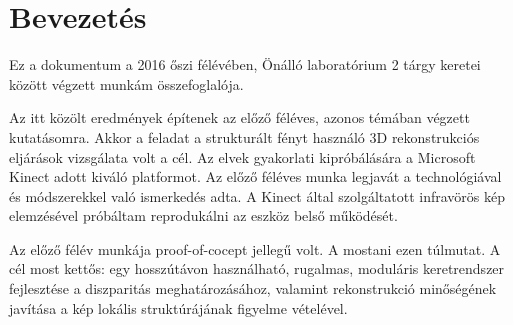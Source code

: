 \chapter*{Bevezetés}

Ez a dokumentum a 2016 őszi félévében, Önálló laboratórium 2 tárgy keretei között végzett munkám összefoglalója.

Az itt közölt eredmények építenek az előző féléves, azonos témában végzett kutatásomra.
Akkor a feladat a strukturált fényt használó 3D rekonstrukciós eljárások vizsgálata volt a cél.
Az elvek gyakorlati kipróbálására a Microsoft Kinect adott kiváló platformot.
Az előző féléves munka legjavát a technológiával és módszerekkel való ismerkedés adta.
A Kinect által szolgáltatott infravörös kép elemzésével próbáltam reprodukálni az eszköz belső működését.

Az előző félév munkája proof-of-cocept jellegű volt.
A mostani ezen túlmutat.
A cél most kettős: egy hosszútávon használható, rugalmas, moduláris keretrendszer fejlesztése a diszparitás meghatározásához, valamint rekonstrukció minőségének javítása a kép lokális struktúrájának figyelme vételével.